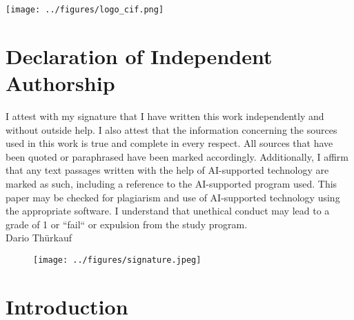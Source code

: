 \documentclass[12pt,a4paper,titlepage,oneside,english]{article}
\begin{document}


\newpage
{}
\tableofcontents

\vfill
\begin{center}
\texttt{[image: ../figures/logo\_cif.png]}
\end{center}
\newpage
\singlespacing
\section*{Declaration of Independent Authorship}
I attest with my signature that I have written this work independently and without outside help. I also attest that the information concerning the sources used in this work is true and complete in every respect. All sources that have been quoted or paraphrased have been marked accordingly. 
Additionally, I affirm that any text passages written with the help of AI-supported technology are marked as such, including a reference to the AI-supported program used. This paper may be checked for plagiarism and use of AI-supported technology using the appropriate software. I understand that unethical conduct may lead to a grade of 1 or ``fail`` or expulsion from the study program.\\

Dario Thürkauf

\begin{figure}[h!]
	\centering
	\hspace{-10cm}
	\texttt{[image: ../figures/signature.jpeg]}
\end{figure}

\newpage
\onehalfspacing
{}



\section{Introduction}
\end{document}
